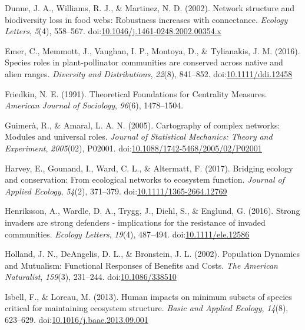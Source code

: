 \documentclass[a4paper]{artikel1}
\theoremstyle{definition}
\theoremstyle{definition}
\theoremstyle{definition}
\theoremstyle{remark}
\begin{document}
\hypertarget{ref-dunne_network_2002}{}
Dunne, J. A., Williams, R. J., \& Martinez, N. D. (2002). Network
structure and biodiversity loss in food webs: Robustness increases with
connectance. \emph{Ecology Letters}, \emph{5}(4), 558--567.
doi:\href{https://doi.org/10.1046/j.1461-0248.2002.00354.x}{10.1046/j.1461-0248.2002.00354.x}

\hypertarget{ref-emer_species_2016}{}
Emer, C., Memmott, J., Vaughan, I. P., Montoya, D., \& Tylianakis, J. M.
(2016). Species roles in plant-pollinator communities are conserved
across native and alien ranges. \emph{Diversity and Distributions},
\emph{22}(8), 841--852.
doi:\href{https://doi.org/10.1111/ddi.12458}{10.1111/ddi.12458}

\hypertarget{ref-noah_e._friedkin_theoretical_1991}{}
Friedkin, N. E. (1991). Theoretical Foundations for Centrality Measures.
\emph{American Journal of Sociology}, \emph{96}(6), 1478--1504.

\hypertarget{ref-guimera_cartography_2005}{}
Guimerà, R., \& Amaral, L. A. N. (2005). Cartography of complex
networks: Modules and universal roles. \emph{Journal of Statistical
Mechanics: Theory and Experiment}, \emph{2005}(02), P02001.
doi:\href{https://doi.org/10.1088/1742-5468/2005/02/P02001}{10.1088/1742-5468/2005/02/P02001}

\hypertarget{ref-harvey_bridging_2017}{}
Harvey, E., Gounand, I., Ward, C. L., \& Altermatt, F. (2017). Bridging
ecology and conservation: From ecological networks to ecosystem
function. \emph{Journal of Applied Ecology}, \emph{54}(2), 371--379.
doi:\href{https://doi.org/10.1111/1365-2664.12769}{10.1111/1365-2664.12769}

\hypertarget{ref-henriksson_strong_2016}{}
Henriksson, A., Wardle, D. A., Trygg, J., Diehl, S., \& Englund, G.
(2016). Strong invaders are strong defenders - implications for the
resistance of invaded communities. \emph{Ecology Letters}, \emph{19}(4),
487--494.
doi:\href{https://doi.org/10.1111/ele.12586}{10.1111/ele.12586}

\hypertarget{ref-holland_population_2002}{}
Holland, J. N., DeAngelis, D. L., \& Bronstein, J. L. (2002). Population
Dynamics and Mutualism: Functional Responses of Benefits and Costs.
\emph{The American Naturalist}, \emph{159}(3), 231--244.
doi:\href{https://doi.org/10.1086/338510}{10.1086/338510}

\hypertarget{ref-isbell_human_2013}{}
Isbell, F., \& Loreau, M. (2013). Human impacts on minimum subsets of
species critical for maintaining ecosystem structure. \emph{Basic and
Applied Ecology}, \emph{14}(8), 623--629.
doi:\href{https://doi.org/10.1016/j.baae.2013.09.001}{10.1016/j.baae.2013.09.001}
\end{document}
